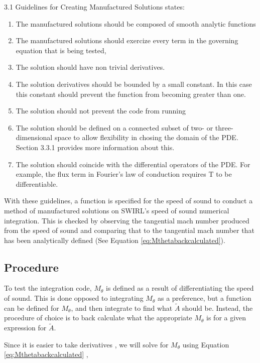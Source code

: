 \documentclass[12pt]{article}
\begin{document}
3.1 Guidelines for Creating Manufactured Solutions states:
\begin{enumerate}
    \item  The manufactured solutions should be composed of smooth analytic 
        functions 
    \item The manufactured solutions should exercize every term in the governing
        equation that is being tested,
    \item The solution should have non trivial derivatives.  
    \item The solution derivatives should be bounded by a small constant. In this case
        this constant should prevent the function from becoming greater than 
        one.
    \item The solution should not prevent the code from running 
    \item The solution should be defined on a connected subset of two- or three-
        dimensional space to allow flexibility in chosing the domain of the PDE.
        Section 3.3.1 provides more information about this.
    \item The solution should coincide with the differential operators of the PDE.
        For example, the flux term in Fourier's law of conduction requires T to 
        be differentiable.
\end{enumerate}
With these guidelines, a function is specified for the speed of sound to conduct
a method of manufactured solutions on SWIRL's speed of sound numerical 
integration. This is checked by observing the tangential mach number 
produced from the speed of sound and comparing that to the tangential mach number
that has been analytically defined (See Equation \ref{eq:Mthetabackcalculated}).
\subsection{Procedure}


To test the integration code,  $M_{\theta}$ is defined as a result 
of differentiating the speed of sound. This is done opposed to integrating
$M_{\theta}$ as a preference, but a function can be defined for $M_{\theta}$, and 
then integrate to find what $\widetilde{A}$ should be. 
Instead, the procedure of choice is to back calculate what the appropriate 
$M_{\theta}$ is for a given expression for $\widetilde{A}$.

Since it is easier to take derivatives , we will solve for $M_{\theta}$ using 
Equation \ref{eq:Mthetabackcalculated} ,
\end{document}
